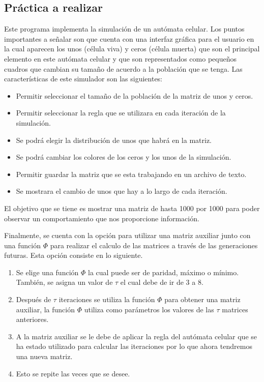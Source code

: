 \documentclass[a4paper,12pt]{article}
\begin{document}
\subsection{Práctica a realizar}
Este programa implementa la simulación de un autómata celular. Los puntos importantes a señalar son que cuenta con una interfaz gráfica para el usuario en la cual aparecen los unos (célula viva) y ceros (célula muerta) que son el principal elemento en este autómata celular y que son representados como pequeños cuadros que cambian su tamaño de acuerdo a la población que se tenga. Las características de este simulador son las siguientes:
\begin{itemize}
 \item Permitir seleccionar el tamaño de la población de la matriz de unos y ceros.
 \item Permitir seleccionar la regla que se utilizara en cada iteración de la simulación.
 \item Se podrá elegir la distribución de unos que habrá en la matriz.
 \item Se podrá cambiar los colores de los ceros y los unos de la simulación.
 \item Permitir guardar la matriz que se esta trabajando en un archivo de texto.
 \item Se mostrara el cambio de unos que hay a lo largo de cada iteración.
\end{itemize}
El objetivo que se tiene es mostrar una matriz de hasta 1000 por 1000 para poder observar un comportamiento que nos proporcione información.

Finalmente, se cuenta con la opción para utilizar una matriz auxiliar junto con una función $\Phi$ para realizar el calculo de las matrices a través de las generaciones futuras. Esta opción consiste en lo siguiente.

\begin{enumerate}
 \item Se elige una función $\Phi$ la cual puede ser de paridad, máximo o mínimo. También, se asigna un valor de $\tau$ el cual debe de ir de 3 a 8.
 \item Después de $\tau$ iteraciones se utiliza la función $\Phi$ para obtener una matriz auxiliar, la función $\Phi$ utiliza como parámetros los valores de las $\tau$ matrices anteriores.
 \item A la matriz auxiliar se le debe de aplicar la regla del autómata celular que se ha estado utilizado para calcular las iteraciones por lo que ahora tendremos una nueva matriz.
 \item Esto se repite las veces que se desee.
\end{enumerate}
\end{document}
